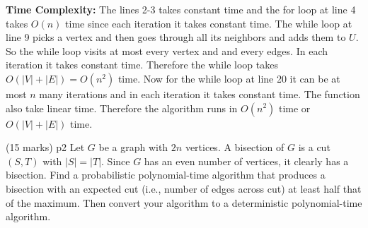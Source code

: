 \documentclass[a4paper, 11pt]{article}
\begin{document}
{\begin{algorithm}[H]
{{			}
			
			
		}
		\caption{$(G,s,t,W)$}
	\end{algorithm}



\parinf

\textbf{Time Complexity:} The lines 2-3 takes constant time and the for loop at line 4 takes $O(n)$ time since each iteration it takes constant time.  The while loop at line 9 picks a vertex and then goes through all its neighbors  and adds them to $U$. So the while loop visits at most every vertex and and every edges. In each iteration it takes constant time. Therefore the while loop takes $O(|V|+|E|)=O(n^2)$ time. Now for the while loop at line 20 it can be at most $n$ many iterations and in each iteration it takes constant time. The  function also take linear time. Therefore the algorithm runs in $O(n^2)$ time or $O(|V|+|E|)$ time.\parinn
}

\begin{problem}{%
		\hfill  (15 marks)
	}{p2%
	}
Let $G$ be a graph with $2 n$ vertices. A bisection of $G$ is a cut $(S, T)$ with $|S|=|T|$. Since $G$ has an even number of vertices, it clearly has a bisection. Find a probabilistic polynomial-time algorithm that produces a bisection with an expected cut (i.e., number of edges across cut) at least half that of the maximum. Then convert your algorithm to a deterministic polynomial-time algorithm.
\end{problem}
\solve{	
}


\end{document}
